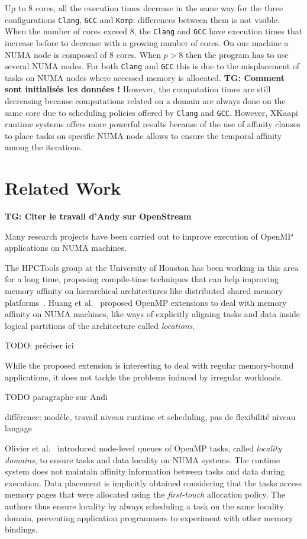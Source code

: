 \documentclass{Styles/llncs}
\newcommand{\TG}[1]{{\color{red}\bfseries TG: #1}}
\begin{document}
Up to 8 cores, all the execution times decrease in the same way for the three configurations \texttt{Clang}, \texttt{GCC} and \texttt{Komp}: differences between them is not visible.
When the number of cores exceed $8$, the \texttt{Clang} and \texttt{GCC} have execution times that increase before to decrease with a growing number of cores.
On our machine a NUMA node is composed of $8$ cores. When $p >8$ then the program has to use several NUMA nodes. For both \texttt{Clang} and \texttt{GCC} this is due to the misplacement of tasks on NUMA nodes where accessed memory is allocated.
\TG{Comment sont initialisés les données !}
However, the computation times are still decreasing because computations related on a domain are always done on the same core due to scheduling policies offered by \texttt{Clang} and \texttt{GCC}.
However, XKaapi runtime systems offers more powerful results because of the use of affinity clauses to place tasks on specific NUMA node allows to ensure the temporal affinity among the iterations.


\section{Related Work}
\label{sec:related_work}

\TG{Citer le travail d'Andy sur OpenStream}

Many research projects have been carried out to improve execution of
OpenMP applications on NUMA machines.

The HPCTools group at the University of Houston has been working in
this area for a long time, proposing compile-time techniques that can
help improving memory affinity on hierarchical architectures like
distributed shared memory
platforms~\cite{Marowka:2004:OAD:1064428.1064431}. Huang et
al.~\cite{Huang-Chapman-locality-OpenMP} proposed OpenMP extensions to
deal with memory affinity on NUMA machines, like ways of explicitly
aligning tasks and data inside logical partitions of the architecture
called \textit{locations}.

TODO: préciser ici

While the proposed extension is interesting
to deal with regular memory-bound applications, it does not tackle
the problems induced by irregular workloads.

TODO paragraphe sur Andi

différence: modèle, travail niveau runtime et scheduling, pas de flexibilité niveau langage

Olivier et
al.~\cite{Olivier:2012:CMW:2388996.2389085}
introduced node-level queues of OpenMP tasks, called \textit{locality
  domains}, to ensure tasks and data locality on NUMA systems. The
runtime system does not maintain affinity information between tasks
and data during execution. Data placement is implicitly obtained
considering that the tasks access memory pages that were allocated
using the \textit{first-touch} allocation policy. The authors thus
ensure locality by always scheduling a task on the same locality
domain, preventing application programmers to experiment with other
memory bindings.
\end{document}
